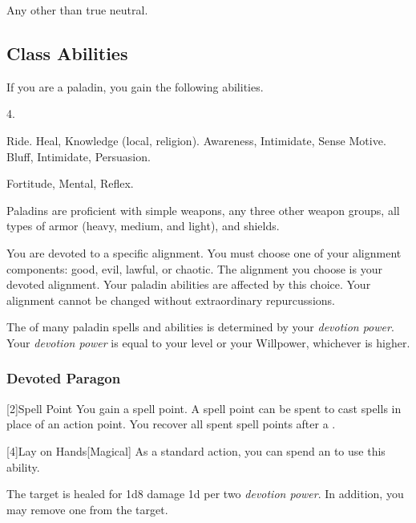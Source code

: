      Any other than true neutral.

    \subsection{Class Abilities}
        If you are a paladin, you gain the following abilities.

         4.

         Ride.
         Heal, Knowledge (local, religion).
         Awareness, Intimidate, Sense Motive.
         Bluff, Intimidate, Persuasion.

          Fortitude,  Mental,  Reflex.

        Paladins are proficient with simple weapons, any three other weapon groups, all types of armor (heavy, medium, and light), and shields.

        You are devoted to a specific alignment.
        You must choose one of your alignment components: good, evil, lawful, or chaotic.
        The alignment you choose is your devoted alignment.
        Your paladin abilities are affected by this choice.
        Your alignment cannot be changed without extraordinary repurcussions.

        The  of many paladin spells and abilities is determined by your \textit{devotion power}.
        Your \textit{devotion power} is equal to your level or your Willpower, whichever is higher.

        \subsubsection{Devoted Paragon}

            [2]{Spell Point}
            You gain a spell point.
            A spell point can be spent to cast spells in place of an action point.
            You recover all spent spell points after a .

            [4]{Lay on Hands}[Magical] As a standard action, you can spend an  to use this ability.
            \begin{ability}
                \begin{spelltargetinginfo}
                \end{spelltargetinginfo}
                \begin{spelleffects}
                    \spelleffect The target is healed for 1d8 damage \add 1d per two \textit{devotion power}.
                    In addition, you may remove one  from the target.
                \end{spelleffects}
            \end{ability}

